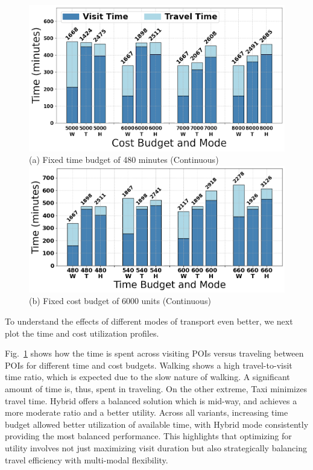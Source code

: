 \begin{figure}[t]
\centering
\includegraphics[width=\figwidth]{plots/tu1.png} \\
(a) Fixed time budget of 480 minutes (Continuous)
\includegraphics[width=\figwidth]{plots/tu2.png} \\
(b) Fixed cost budget of 6000 units (Continuous)
\label{fig:time-utilization}
\end{figure}

To understand the effects of different modes of transport even better, we next plot the time and cost utilization profiles.

Fig.~\ref{fig:time-utilization} shows how the time is spent across visiting POIs versus traveling between POIs for different time and cost budgets.
Walking shows a high travel-to-visit time ratio, which is expected due to the slow nature of walking. A significant amount of time is, thus, spent in traveling. On the other extreme, Taxi minimizes travel time. Hybrid offers a balanced solution which is mid-way, and achieves a more moderate ratio and a better utility.
Across all variants, increasing time budget allowed better utilization of available time, with Hybrid mode consistently providing the most balanced performance. This highlights that optimizing for utility involves not just maximizing visit duration but also strategically balancing travel efficiency with multi-modal flexibility.

